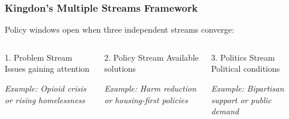 \documentclass[10pt]{beamer}
\begin{document}
\begin{frame}
\frametitle{Kingdon's Multiple Streams Framework}

\begin{block}{}
  \centering
  Policy windows open when three independent streams converge:
\end{block}

\vspace{0.5cm}

\begin{columns}
  \begin{column}{0.32\textwidth}
    \begin{block}{\textcolor{streamblue}{1. Problem Stream}}
      \pause
      Issues gaining attention

      \vspace{0.3cm}
      \small\emph{Example: Opioid crisis or rising homelessness}
    \end{block}
  \end{column}

  \begin{column}{0.32\textwidth}
    \begin{block}{\textcolor{streamgreen}{2. Policy Stream}}
      \pause
      Available solutions

      \vspace{0.3cm}
      \small\emph{Example: Harm reduction or housing-first policies}
    \end{block}
  \end{column}

  \begin{column}{0.32\textwidth}
    \begin{block}{\textcolor{streampurple}{3. Politics Stream}}
      \pause
      Political conditions

      \vspace{0.3cm}
      \small\emph{Example: Bipartisan support or public demand}
    \end{block}
  \end{column}
\end{columns}

\end{frame}
\end{document}

